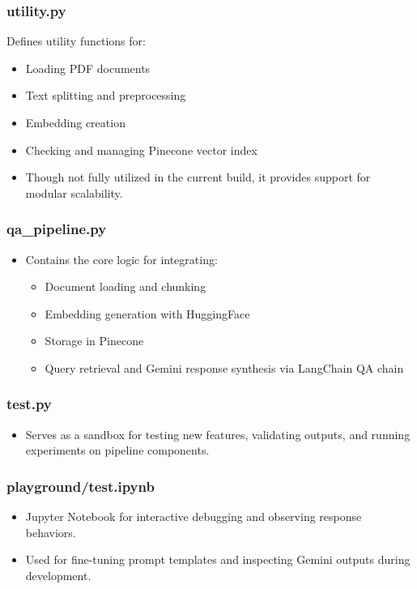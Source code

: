 \documentclass[12pt,a4paper]{report}
\begin{document}
\subsubsection{utility.py}
Defines utility functions for:
\begin{itemize}
    \item Loading PDF documents
    \item Text splitting and preprocessing
    \item Embedding creation
    \item Checking and managing Pinecone vector index
    \item Though not fully utilized in the current build, it provides support for modular scalability.
\end{itemize}

\subsubsection{qa\_pipeline.py}
\begin{itemize}
    \item Contains the core logic for integrating:
    \begin{itemize}
        \item Document loading and chunking
        \item Embedding generation with HuggingFace
        \item Storage in Pinecone
        \item Query retrieval and Gemini response synthesis via LangChain QA chain \cite{langchain}
    \end{itemize}
\end{itemize}

\subsubsection{test.py}
\begin{itemize}
    \item Serves as a sandbox for testing new features, validating outputs, and running experiments on pipeline components.
\end{itemize}

\subsubsection{playground/test.ipynb}
\begin{itemize}
    \item Jupyter Notebook for interactive debugging and observing response behaviors.
    \item Used for fine-tuning prompt templates and inspecting Gemini outputs during development.
\end{itemize}
\end{document}
